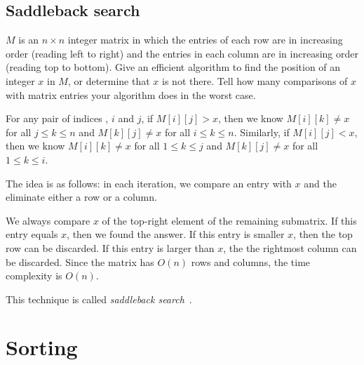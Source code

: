 \subsection{Saddleback search}

\begin{Exercise}[origin={NTU CSIE 93}]
$M$ is an $n \times n$ integer matrix in which the entries of each row are in increasing order (reading left to right) and the entries in each column are in increasing order (reading top to bottom). Give an efficient algorithm to find the position of an integer $x$ in $M$, or determine that $x$ is not there. Tell how many comparisons of $x$ with matrix entries your algorithm does in the worst case.
\end{Exercise}
\begin{Answer}
For any pair of indices , $i$ and $j$, if $M[i][j] > x$, then we know $M[i][k] \neq x$ for all $j \leq k \leq n$ and $M[k][j] \neq x$ for all $i \leq k \leq n$. Similarly, if $M[i][j] < x$, then we know $M[i][k] \neq x$ for all $1 \leq k \leq j$ and $M[k][j] \neq x$ for all $1 \leq k \leq i$. 

The idea is as follows: in each iteration, we compare an entry with $x$ and the eliminate either a row or a column.

We always compare $x$ of the top-right element of the remaining submatrix. If this entry equals $x$, then we found the answer. If this entry is smaller $x$, then the top row can be discarded. If this entry is larger than $x$, the the rightmost column can be discarded. Since the matrix has $O(n)$ rows and columns, the time complexity is $O(n)$. 

\begin{remark}
This technique is called \emph{saddleback search}~\cite{Bird2006}.
\end{remark}
\end{Answer}


\section{Sorting}

